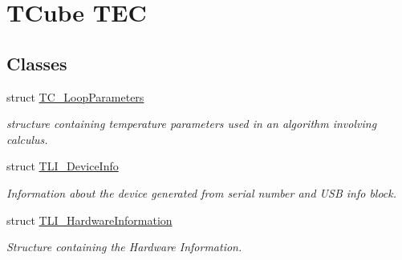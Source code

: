 \hypertarget{group___t_cube_t_e_c}{}\section{T\+Cube T\+EC}
\label{group___t_cube_t_e_c}
\subsection*{Classes}
\begin{DoxyCompactItemize}
\item 
struct \hyperlink{struct_t_c___loop_parameters}{T\+C\+\_\+\+Loop\+Parameters}
\begin{DoxyCompactList}\small\item\em structure containing temperature parameters used in an algorithm involving calculus. \end{DoxyCompactList}\item 
struct \hyperlink{struct_t_l_i___device_info}{T\+L\+I\+\_\+\+Device\+Info}
\begin{DoxyCompactList}\small\item\em Information about the device generated from serial number and U\+SB info block. \end{DoxyCompactList}\item 
struct \hyperlink{struct_t_l_i___hardware_information}{T\+L\+I\+\_\+\+Hardware\+Information}
\begin{DoxyCompactList}\small\item\em Structure containing the Hardware Information. \end{DoxyCompactList}\end{DoxyCompactItemize}
